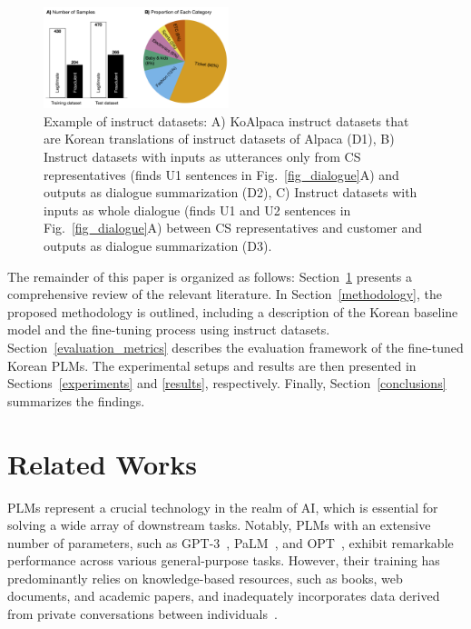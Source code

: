 \documentclass[sigconf]{acmart}
\begin{document}
\begin{figure}[t!]
  \centering
  \includegraphics[width=0.48\textwidth]{figures/fig_dataset.png}
  \caption{Example of instruct datasets: 
  A) KoAlpaca instruct datasets that are Korean translations of instruct datasets of Alpaca (D1), 
  B) Instruct datasets with inputs as utterances only from CS representatives (finds U1 sentences in Fig.~\ref{fig_dialogue}A) and outputs as dialogue summarization (D2), 
  C) Instruct datasets with inputs as whole dialogue (finds U1 and U2 sentences in Fig.~\ref{fig_dialogue}A) between CS representatives and customer and outputs as dialogue summarization (D3).
  }
\label{fig_dataset}
\end{figure}



The remainder of this paper is organized as follows: Section~\ref{related_work} presents a comprehensive review of the relevant literature. In Section~\ref{methodology}, the proposed methodology is outlined, including a description of the Korean baseline model and the fine-tuning process using instruct datasets. Section~\ref{evaluation_metrics} describes the evaluation framework of the fine-tuned Korean PLMs. The experimental setups and results are then presented in Sections~\ref{experiments} and \ref{results}, respectively. Finally, Section~\ref{conclusions} summarizes the findings.



\section{Related Works}\label{related_work}
PLMs represent a crucial technology in the realm of AI, which is essential for solving a wide array of downstream tasks. Notably, PLMs with an extensive number of parameters, such as GPT-3~\cite{brown2020gpt3}, PaLM~\cite{chowdhery2022palm}, and OPT~\cite{zhang2022opt}, exhibit remarkable performance across various general-purpose tasks. However, their training has predominantly relies on knowledge-based resources, such as books, web documents, and academic papers, and inadequately incorporates data derived from private conversations between individuals~\cite{gliwa2019samsum,zhong2021qmsum}.
\end{document}
